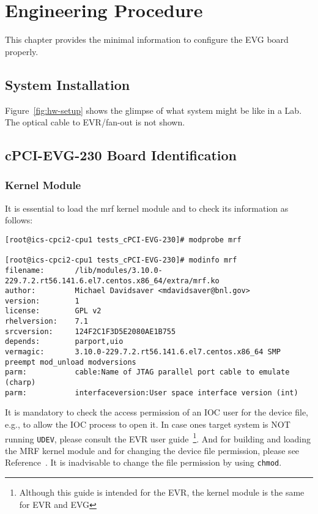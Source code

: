\documentclass[11pt
  , a4paper
  , article
  , oneside
  , showtrims
]{memoir}
\begin{document}
\clearpage
\chapter{Engineering Procedure}
This chapter provides the minimal information to configure the EVG board properly. 

\section{System Installation}
Figure~\ref{fig:hw-setup} shows the glimpse of what system might be like in a Lab. The optical cable to EVR/fan-out is not shown.
  
\section{cPCI-EVG-230 Board Identification}
         
\subsection{Kernel Module}
It is essential to load the mrf kernel module and to check its information as follows:
\begin{lstlisting}[style=termstyle]
[root@ics-cpci2-cpu1 tests_cPCI-EVG-230]# modprobe mrf

[root@ics-cpci2-cpu1 tests_cPCI-EVG-230]# modinfo mrf
filename:       /lib/modules/3.10.0-229.7.2.rt56.141.6.el7.centos.x86_64/extra/mrf.ko
author:         Michael Davidsaver <mdavidsaver@bnl.gov>
version:        1
license:        GPL v2
rhelversion:    7.1
srcversion:     124F2C1F3D5E2080AE1B755
depends:        parport,uio
vermagic:       3.10.0-229.7.2.rt56.141.6.el7.centos.x86_64 SMP preempt mod_unload modversions 
parm:           cable:Name of JTAG parallel port cable to emulate (charp)
parm:           interfaceversion:User space interface version (int)
\end{lstlisting}

It is mandatory to check the access permission of an IOC user for the device file, e.g.,  to allow the IOC process to open it. In case ones target system is NOT running \texttt{UDEV}, please consult the EVR user guide~\cite{EVR-USER-GUIDE}\footnote{Although this guide is intended for the EVR, the kernel module is the same for EVR and EVG}. And for building and loading the MRF kernel module and for changing the device file permission, please see Reference~\citep[see][p12,13]{EVR-USER-GUIDE}. It is inadvisable to change the file permission by using \texttt{chmod}. 
\end{document}
